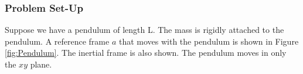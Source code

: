 \documentclass[12pt]{report}
\begin{document}
\subsubsection{Problem Set-Up}
Suppose we have a pendulum of length L. The mass is rigidly attached to the pendulum. A reference frame $a$ that moves with the pendulum is shown in Figure \ref{fig:Pendulum}. The inertial frame is also shown. The pendulum moves in only the $xy$ plane.
\begin{figure}[ht]

\centering


\begin{tikzpicture}[x=0.75pt,y=0.75pt,yscale=-1,xscale=1]


\end{tikzpicture}
\end{figure}
\end{document}
